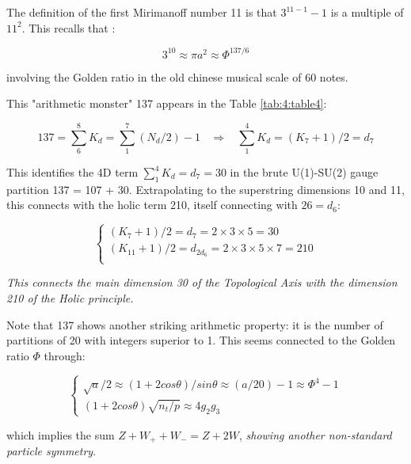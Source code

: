\documentclass[a4paper,9pt]{article}
\newcounter{row}
\begin{document}
The definition of the first Mirimanoff number 11 is that $3^{11-1}-1$ is a multiple of $11^2$. This recalls that \cite{Sanchez5}:

\begin{equation}
3^{10} \approx \pi a^2 \approx \Phi^{137/6}
\end{equation}

involving the Golden ratio in the old chinese musical scale of 60 notes.

This "arithmetic monster" 137 appears in the Table \ref{tab:4:table4}:

\begin{equation}\label{Eq36}
137 = \sum_6^8 K_d = \sum_1^7(N_d/2) -1   ~~~~ \Rightarrow~~~~ \sum_1^4K_d = (K_7+1)/2 = d_7  
 \end{equation}
 
This identifies the 4D term $\sum_1^4K_d =  d_7 = 30$ in the brute U(1)-SU(2) gauge partition 137 = 107 + 30\cite{Taylor}. Extrapolating to the superstring dimensions 10 and 11, this connects with the holic term 210, itself connecting with $26 = d_6$:
 
 \begin{equation}\label{Eq37}
 \left\{
    \begin{array}{ll}
          (K_7+1)/2 = d_7 = 2\times3\times5 = 30\\
          (K_{11}+1)/2 = d_{2d_6} = 2\times3\times5\times7 = 210 \\
    \end{array}
\right.
\end{equation}

\textit{This connects the main dimension 30 of the Topological Axis with the dimension 210 of the Holic principle.}

Note that 137 shows another striking arithmetic property: it is the number of partitions of 20 with integers superior to 1. This seems connected to the Golden ratio $\Phi$ through:

\begin{equation}\label{Eq37}
 \left\{
    \begin{array}{ll}
          \sqrt a/2 \approx (1+2cos\theta)/sin\theta \approx (a/20) -1 \approx \Phi^4 - 1 \\
           (1+2cos\theta) \sqrt{n_t/p} \approx4 g_2 g_3
    \end{array}
\right.
\end{equation}

which implies the sum $Z + W_+ + W_- = Z + 2W$, \textit{showing another non-standard particle symmetry}.
\end{document}
